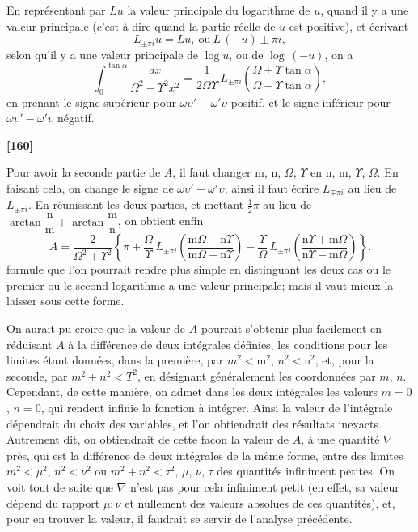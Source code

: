 \documentclass[11pt,a4paper]{book}
\begin{document}
En repr\'esentant par $Lu$ la valeur principale du logarithme de $u$, quand il y a
une valeur principale (c'est-\`a-dire quand la partie r\'eelle de $u$ est positive), et
\'ecrivant
\[L_{\pm\pi i} u = Lu,\ \text{ou}\ L\,(-u) \pm \pi i,\]
selon qu'il y a une valeur principale de $\log u$, ou de $\log\,(-u)$, on a
\begin{equation}
\int_0^{\tan\alpha} \frac{dx}{\Omega^2 - \Upsilon^2 x^2}
= \frac{1}{2\Omega\Upsilon}\, L_{\pm\pi i} \left(\frac{\Omega + \Upsilon\tan\alpha}{\Omega - \Upsilon\tan\alpha}\right), \tag{8}
\end{equation}
en prenant le signe sup\'erieur pour $\omega\upsilon' - \omega'\upsilon$ positif, et le signe inf\'erieur pour $\omega\upsilon' - \omega'\upsilon$
n\'egatif.


\textbf{[160]}

Pour avoir la seconde partie de $A$, il faut changer m, n, $\Omega$, $\Upsilon$ en n, m, $\Upsilon$, $\Omega$. En
faisant cela, on change le signe de $\omega\upsilon' - \omega'\upsilon$; ainsi il faut \'ecrire $L_{\mp\pi i}$ au lieu de $L_{\pm\pi i}$.
En r\'eunissant les deux parties, et mettant $\tfrac{1}{2}\pi$ au lieu de $\arctan\dfrac{\mathrm{n}}{\mathrm{m}} + \arctan\dfrac{\mathrm{m}}{\mathrm{n}}$, on
obtient enfin
\begin{equation}
A = \frac{2}{\Omega^2 + \Upsilon^2} \left\{\pi + \frac{\Omega}{\Upsilon}\, L_{\pm\pi i}\left(\frac{\mathrm{m}\Omega + \mathrm{n}\Upsilon}{\mathrm{m}\Omega - \mathrm{n}\Upsilon}\right)
- \frac{\Upsilon}{\Omega}\, L_{\pm\pi i}\left(\frac{\mathrm{n}\Upsilon + \mathrm{m}\Omega}{\mathrm{n}\Upsilon - \mathrm{m}\Omega}\right)\right\}. \tag{9}
\end{equation}
formule que l'on pourrait rendre plus simple en distinguant les deux cas ou le premier
ou le second logarithme a une valeur principale; mais il vaut mieux la laisser sous
 cette forme.

On aurait pu croire que la valeur de $A$ pourrait s'obtenir plus facilement en
r\'eduisant $A$ \`a la diff\'erence de deux int\'egrales d\'efinies, les conditions pour les limites
\'etant donn\'ees, dans la premi\`ere, par $m^2 < \mathrm{m}^2$, $n^2 < \mathrm{n}^2$, et, pour la seconde, par $m^2 + n^2 < T^2$,
en d\'esignant g\'en\'eralement les coordonn\'ees par $m$, $n$. Cependant, de cette mani\`ere, on
admet dans les deux int\'egrales les valeurs $m = 0$, $n = 0$, qui rendent infinie la fonction
\`a int\'egrer. Ainsi la valeur de l'int\'egrale d\'ependrait du choix des variables, et l'on
obtiendrait des r\'esultats inexacts. Autrement dit, on obtiendrait de cette facon la
valeur de $A$, \`a une quantit\'e $\nabla$ pr\`es, qui est la diff\'erence de deux int\'egrales de la
m\^eme forme, entre des limites $m^2 < \mu^2$, $n^2 < \nu^2$ ou $m^2 + n^2 < \tau^2$, $\mu$, $\nu$, $\tau$ des quantit\'es
infiniment petites. On voit tout de suite que $\nabla$ n'est pas pour cela infiniment petit
(en effet, sa valeur d\'epend du rapport $\mu : \nu$ et nullement des valeurs absolues de ces
quantit\'es), et, pour en trouver la valeur, il faudrait se servir de l'analyse pr\'ec\'edente.
\end{document}
